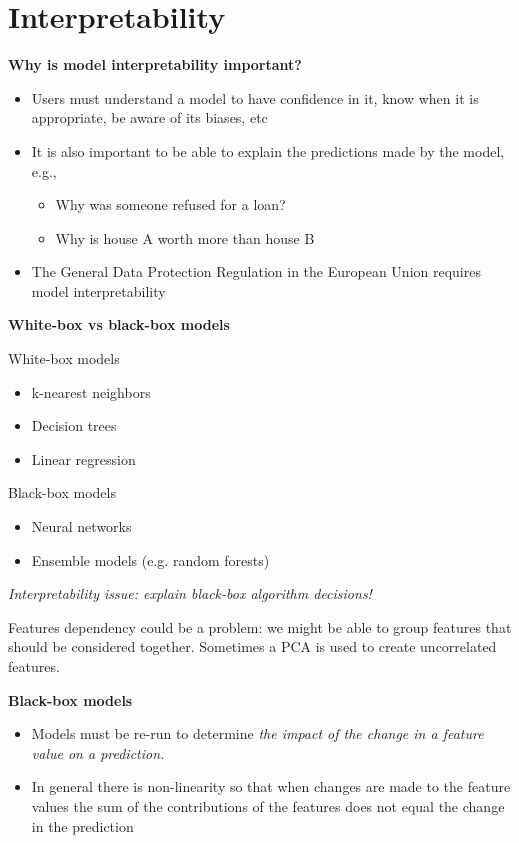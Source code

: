 \section{Interpretability}

\textbf{Why is model interpretability important?}
\begin{itemize}
    \item Users must understand a model to have confidence in it, know when it is appropriate, be aware of its biases, etc
    \item It is also important to be able to explain the predictions made by the model, e.g.,
          \begin{itemize}
              \item Why was someone refused for a loan?
              \item Why is house A worth more than house B
          \end{itemize}
    \item The General Data Protection Regulation in the European Union requires model interpretability
\end{itemize}

\textbf{White-box vs black-box models}

White-box models
\begin{itemize}
    \item k-nearest neighbors
    \item Decision trees
    \item Linear regression
\end{itemize}

Black-box models
\begin{itemize}
    \item Neural networks
    \item Ensemble models (e.g. random forests)
\end{itemize}

\textit{Interpretability issue: explain black-box algorithm decisions!}

Features dependency could be a problem: we might be able to group features that should be considered together. Sometimes a PCA is used to create uncorrelated features. 

\textbf{Black-box models}
\begin{itemize}
    \item Models must be re-run to determine \textit{the impact of the change in a feature value on a prediction.}
    \item In general there is non-linearity so that when changes are made to the feature values the sum of the contributions of the features does not equal the change in the prediction
\end{itemize}

